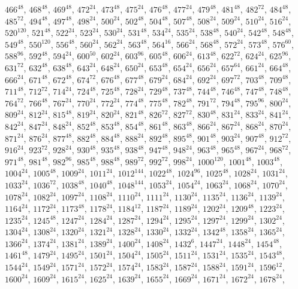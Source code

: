 \begin{itemize}
$466^{48}$, $468^{48}$, $469^{48}$, $472^{24}$, $473^{48}$, $475^{24}$, $476^{48}$, $477^{24}$, $479^{48}$, $481^{48}$, $482^{72}$, $484^{48}$, $485^{72}$, $494^{48}$, $497^{48}$, $498^{24}$, $500^{24}$, $502^{48}$, $504^{48}$, $507^{48}$, $508^{24}$, $509^{24}$, $510^{24}$, $516^{24}$, $520^{120}$, $521^{48}$, $522^{24}$, $523^{24}$, $530^{24}$, $531^{48}$, $534^{24}$, $535^{24}$, $538^{48}$, $540^{24}$, $542^{48}$, $548^{48}$, $549^{48}$, $550^{120}$, $556^{48}$, $560^{24}$, $562^{24}$, $563^{48}$, $564^{16}$, $566^{24}$, $568^{48}$, $572^{24}$, $573^{48}$, $576^{60}$, $588^{96}$, $592^{48}$, $594^{24}$, $600^{50}$, $602^{24}$, $603^{96}$, $605^{48}$, $606^{24}$, $613^{48}$, $622^{72}$, $624^{24}$, $625^{96}$, $631^{72}$, $632^{48}$, $638^{48}$, $643^{24}$, $648^{24}$, $650^{24}$, $653^{48}$, $654^{24}$, $656^{24}$, $657^{64}$, $661^{24}$, $664^{48}$, $666^{24}$, $671^{48}$, $672^{48}$, $674^{72}$, $676^{48}$, $677^{48}$, $679^{24}$, $684^{24}$, $692^{24}$, $697^{72}$, $703^{48}$, $709^{48}$, $711^{48}$, $712^{72}$, $714^{24}$, $724^{48}$, $725^{48}$, $728^{24}$, $729^{48}$, $737^{48}$, $744^{48}$, $746^{48}$, $747^{48}$, $748^{48}$, $764^{72}$, $766^{48}$, $767^{24}$, $770^{24}$, $772^{24}$, $774^{48}$, $775^{48}$, $782^{48}$, $791^{72}$, $794^{48}$, $795^{96}$, $800^{24}$, $809^{24}$, $812^{24}$, $815^{48}$, $819^{24}$, $820^{24}$, $821^{48}$, $826^{72}$, $827^{72}$, $830^{48}$, $831^{24}$, $833^{24}$, $841^{24}$, $842^{24}$, $847^{24}$, $848^{24}$, $852^{48}$, $853^{48}$, $854^{48}$, $861^{48}$, $863^{48}$, $866^{24}$, $867^{24}$, $868^{24}$, $870^{24}$, $871^{24}$, $876^{24}$, $877^{48}$, $882^{48}$, $884^{48}$, $888^{24}$, $892^{48}$, $895^{48}$, $901^{48}$, $903^{24}$, $907^{48}$, $912^{72}$, $916^{24}$, $923^{72}$, $928^{24}$, $930^{48}$, $935^{48}$, $938^{48}$, $947^{48}$, $948^{24}$, $963^{48}$, $965^{48}$, $967^{24}$, $968^{72}$, $971^{48}$, $981^{48}$, $982^{96}$, $985^{48}$, $988^{48}$, $989^{72}$, $992^{72}$, $998^{24}$, $1000^{120}$, $1001^{48}$, $1003^{48}$, $1004^{24}$, $1005^{48}$, $1009^{24}$, $1011^{24}$, $1012^{144}$, $1022^{48}$, $1024^{96}$, $1025^{48}$, $1028^{24}$, $1031^{24}$, $1033^{24}$, $1036^{72}$, $1038^{48}$, $1040^{48}$, $1048^{144}$, $1053^{24}$, $1054^{24}$, $1063^{24}$, $1068^{24}$, $1070^{24}$, $1078^{24}$, $1082^{24}$, $1097^{24}$, $1108^{24}$, $1110^{24}$, $1111^{24}$, $1130^{24}$, $1135^{24}$, $1136^{24}$, $1139^{24}$, $1164^{24}$, $1172^{24}$, $1173^{48}$, $1178^{24}$, $1184^{12}$, $1187^{24}$, $1189^{24}$, $1202^{24}$, $1209^{48}$, $1223^{24}$, $1235^{24}$, $1245^{48}$, $1247^{24}$, $1284^{24}$, $1287^{24}$, $1294^{24}$, $1295^{24}$, $1297^{24}$, $1299^{24}$, $1302^{24}$, $1304^{24}$, $1308^{24}$, $1320^{24}$, $1321^{24}$, $1328^{24}$, $1330^{24}$, $1332^{24}$, $1342^{48}$, $1358^{24}$, $1365^{24}$, $1366^{24}$, $1374^{24}$, $1381^{24}$, $1389^{24}$, $1400^{24}$, $1408^{24}$, $1432^{6}$, $1447^{24}$, $1448^{24}$, $1454^{48}$, $1461^{48}$, $1479^{24}$, $1495^{24}$, $1501^{24}$, $1504^{24}$, $1505^{24}$, $1511^{24}$, $1531^{24}$, $1535^{24}$, $1543^{48}$, $1544^{24}$, $1549^{24}$, $1571^{24}$, $1572^{24}$, $1574^{24}$, $1583^{24}$, $1587^{24}$, $1588^{24}$, $1591^{24}$, $1596^{12}$, $1600^{24}$, $1609^{24}$, $1615^{24}$, $1625^{24}$, $1639^{24}$, $1655^{24}$, $1669^{24}$, $1671^{24}$, $1672^{24}$, $1678^{24}$, 
\end{itemize}
